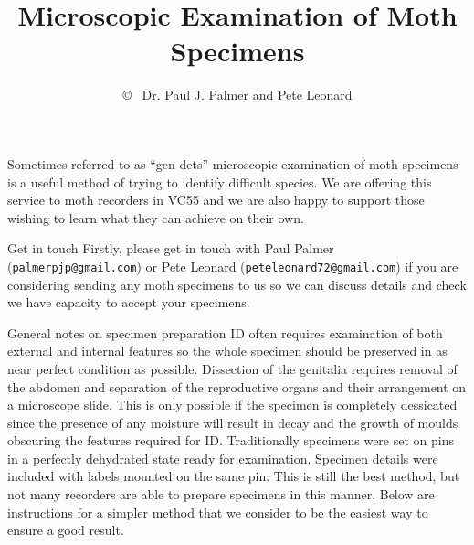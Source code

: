 \documentclass[10pt]{article}
\title{Microscopic Examination of Moth Specimens}
\author{  \copyright ~  {Dr. Paul J. Palmer} and {Pete Leonard}}
\begin{document}
{}
%

Sometimes referred to as \enquote{gen dets} microscopic examination of moth specimens is a useful method of trying to identify difficult species. We are offering this service to moth recorders in VC55 and we are also happy to support those wishing to learn what they can achieve on their own.   

	\item[Get in touch] Firstly, please get in touch with Paul Palmer (\texttt{palmerpjp@gmail.com}) or Pete Leonard (\texttt{peteleonard72@gmail.com}) if  you are considering sending  any moth specimens to us so we can discuss details and check we have capacity to accept your specimens. 

	\item[General notes on specimen preparation] ID often requires examination of both external and internal features so the whole specimen should be preserved in as near perfect condition as possible. Dissection of the genitalia requires removal of the abdomen and separation of the reproductive organs and their arrangement on a microscope slide. This is only possible if the specimen is completely dessicated since the presence of any moisture will result in decay and the growth of moulds obscuring the features required for ID. Traditionally specimens were set on pins in a perfectly dehydrated state ready for examination. Specimen details were included  with labels mounted on the same pin. This is still the best method, but not many recorders are able to prepare specimens in this manner. Below are instructions for a simpler method that we consider to be the easiest way to ensure a good result. 
	
\end{document}
